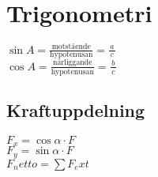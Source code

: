 \section{Trigonometri}
\begin{math}
	\sin A=\frac{\textrm{motstående}}{\textrm{hypotenusan}}=\frac{a}{\,c\,}
\end{math} \\[2pt]
\begin{math}
	\cos A=\frac{\textrm{närliggande}}{\textrm{hypotenusan}}=\frac{b}{\,c\,}
\end{math} \\[2pt]

\subsection{Kraftuppdelning}
\begin{math}
    F_x = \cos \alpha \cdot F
\end{math} \\[2pt]
\begin{math}
    F_y = \sin \alpha \cdot F
\end{math} \\[2pt]
\begin{math}
    F_netto = \sum F_ext
\end{math} \\[2pt]


